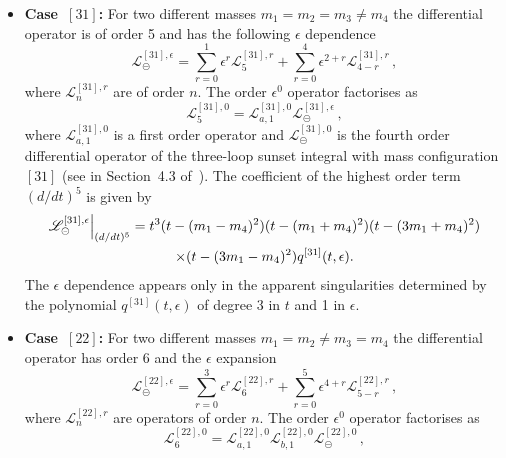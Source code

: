 \documentclass[a4paper,12pt]{article}
\numberwithin{equation}{section}
\numberwithin{figure}{section}
\def\su{\circleddash}
\begin{document}
\begin{itemize}

  \item   {\bf Case~$[31]$:} For two different masses $m_1=m_2=m_3 \neq m_4$ the
  differential operator is of order 5 and has the following $\epsilon$ dependence
  \begin{equation}
    \mathscr{L}^{[31],\epsilon}_\su=       \sum_{r=0}^1 \epsilon^r
    \mathscr{L}^{[31],r}_{5}+  \sum_{r=0}^4 \epsilon^{2+r}   \mathscr{L}^{[31],r}_{4-r} \, ,
  \end{equation}
  where  $ \mathscr{L}^{[31],r}_{n}$ are of order $n$.
  The order $\epsilon^0$ operator factorises as
  \begin{equation}
         \mathscr{L}^{[31],0}_{5}=   \mathscr{L}^{[31],0}_{a,1} \mathscr{L}^{[31],\epsilon}_\su \, , 
       \end{equation}
        where  $ \mathscr{L}^{[31],0}_{a,1}$ is a  first order operator
       and $\mathscr{L}^{[31],0}_\su$ is the fourth order
       differential operator of the
       three-loop sunset integral with mass configuration $[31]$ (see 
       in Section~4.3 of~\cite{Lairez:2022zkj}).
       The coefficient of the highest order term $(d/dt)^5$    is given by
       \begin{multline}
                   \mathscr{L}^{[31],\epsilon}_\su\Big\vert_{(d/dt)^5}=
                   t^3  (t-(m_1-m_4)^2)(t-(m_1+m_4)^2)(t-(3m_1+m_4)^2) \cr\times (t-(3m_1-m_4)^2)
            q^{[31]}(t,\epsilon)      .
                 \end{multline}
                 The $\epsilon$ dependence appears only in the
                 apparent singularities determined by the polynomial
                 $q^{[31]}(t,\epsilon)$ of degree 3 in $t$ and 1 in $\epsilon$.
\item   {\bf Case~$[22]$:} For two different masses $m_1=m_2\neq m_3 = m_4$ the
  differential operator has order 6 and the $\epsilon$ expansion 
  \begin{equation}
    \mathscr{L}_\su^{[22],\epsilon}=     \sum_{r=0}^3 \epsilon^r
    \mathscr{L}^{[22],r}_{6}+  \sum_{r=0}^5 \epsilon^{4+r}   \mathscr{L}^{[22],r}_{5-r} \, ,
  \end{equation}
  where  $ \mathscr{L}^{[22],r}_{n}$ are 
  operators of order $n$.
  The order $\epsilon^0$ operator factorises as
  \begin{equation}
         \mathscr{L}^{[22],0}_{6}=   \mathscr{L}^{[22],0}_{a,1} \mathscr{L}^{[22],0}_{b,1}\mathscr{L}^{[22],0}_\su \,,
       \end{equation}

\end{itemize}
\end{document}

